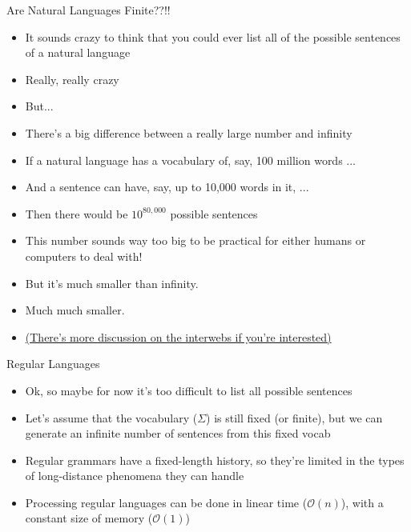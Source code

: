 \documentclass{beamer}
\newcommand{\detail}[1]{{\color{lightgrey}\small{}#1}}
\begin{document}
\begin{frame}{Are Natural Languages Finite??!!}
\begin{block}{}
\begin{itemize}
	\item It sounds crazy to think that you could ever list all of the possible sentences of a natural language
	\pause
	\item Really, really crazy
	\pause
	\item But...
	\pause
	\item There's a big difference between a really large number and infinity
	\pause
	\item {\small If a natural language has a vocabulary of, say, 100 million words ...}
	\pause
	\item And a sentence can have, say, up to 10,000 words in it, ...
	\pause
	\item Then there would be $10^{80,000}$ possible sentences
	\pause
	\item This number sounds way too big to be practical for either humans or computers to deal with!
	\pause
	\item But it's much smaller than infinity.
	\pause
	\item Much much smaller.
	\pause
	\item \tiny{\href{http://people.umass.edu/~partee/726_04/lectures/Is_Language_Infinite.pdf}{(There's more discussion on the interwebs if you're interested)}}
\end{itemize}
\end{block}
\end{frame}


\begin{frame}{Regular Languages}
\begin{block}{}
\begin{itemize}
	\item Ok, so maybe for now it's too difficult to list all possible sentences
	\item Let's assume that the vocabulary ($\Sigma$) is still fixed (or finite), but we can generate an infinite number of sentences from this fixed vocab
	\item Regular grammars have a fixed-length history, so they're limited in the types of long-distance phenomena they can handle
	\pause
	\item Processing regular languages can be done in linear time \detail{($\mathcal{O}(n)$)}, with a constant size of memory \detail{($\mathcal{O}(1)$)}
\end{itemize}
\end{block}
\end{frame}
\end{document}

